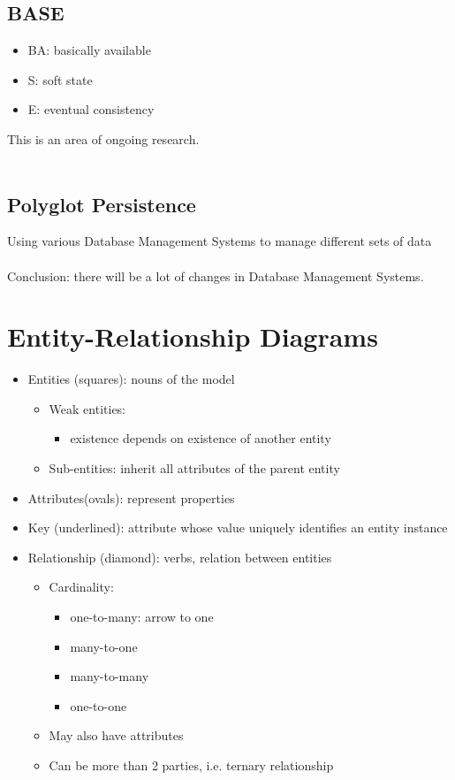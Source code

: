\documentclass[12pt,a4paper]{article} %
\begin{document}
\subsection{BASE}
	\begin{itemize}
	\item BA: basically available
	\item S: soft state
	\item E: eventual consistency
	\end{itemize}
This is an area of ongoing research.
\\\\
\subsection{Polyglot Persistence}

Using various Database Management Systems to manage different sets of data
\\\\
Conclusion: there will be a lot of changes in Database Management Systems.
\section{Entity-Relationship Diagrams}
\begin{itemize}
\item Entities (squares): nouns of the model
	\begin{itemize}
	\item Weak entities: 
		\begin{itemize}
		\item existence depends on existence of another entity
		\end{itemize}
	\item Sub-entities: inherit all attributes of the parent entity
	\end{itemize}
\item Attributes(ovals): represent properties
\item Key (underlined): attribute whose value uniquely identifies an entity instance
\item Relationship (diamond): verbs, relation between entities
	\begin{itemize}
	\item Cardinality:
		\begin{itemize}
		\item one-to-many: arrow to one
		\item many-to-one
		\item many-to-many
		\item one-to-one
		\end{itemize}
	\item May also have attributes
	\item Can be more than 2 parties, i.e. ternary relationship
	\end{itemize}
\end{itemize}
\end{document}
